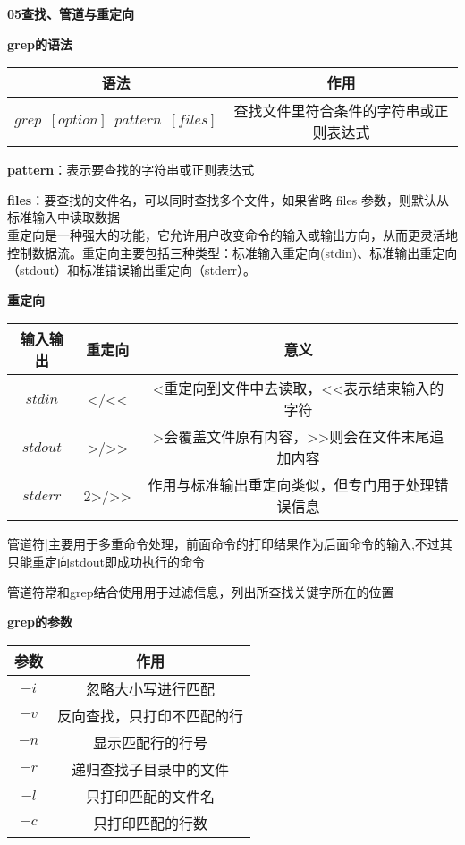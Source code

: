 \textbf{05查找、管道与重定向}

\begin{center}
\textbf{grep\enspace 的语法}

	\begin{tabular}{cc}
		\toprule[1.5pt]
		语法 & 作用\\
		\midrule[1pt]
		$  grep\enspace [option]\enspace pattern\enspace [files]$		&查找文件里符合条件的字符串或正则表达式\\
		\bottomrule[1.5pt]
	\end{tabular}
\end{center}

\textbf{pattern}：表示要查找的字符串或正则表达式

\textbf{files}：要查找的文件名，可以同时查找多个文件，如果省略 files 参数，则默认从标准输入中读取数据\\

重定向是一种强大的功能，它允许用户改变命令的输入或输出方向，从而更灵活地控制数据流。重定向主要包括三种类型：标准输入重定向(stdin)、标准输出重定向（stdout）和标准错误输出重定向（stderr）。

\begin{center}
\textbf{重定向}

	\begin{tabular}{ccc}
		\toprule[1.5pt]
		输入输出 & 重定向 & 意义\\
		\midrule[1pt]
		$  stdin$		& <\enspace /\enspace <<		& <重定向到文件中去读取，<<表示结束输入的字符\\
		$  stdout$		& >\enspace /\enspace >>		& >会覆盖文件原有内容，>>则会在文件末尾追加内容\\
		$  stderr$		& 2>\enspace /\enspace 2>>		&作用与标准输出重定向类似，但专门用于处理错误信息\\
		\bottomrule[1.5pt]
	\end{tabular}
\end{center}

管道符|主要用于多重命令处理，前面命令的打印结果作为后面命令的输入,不过其只能重定向stdout即成功执行的命令

管道符常和grep结合使用用于过滤信息，列出所查找关键字所在的位置

\begin{center}
\textbf{grep的参数}

	\begin{tabular}{cc}
		\toprule[1.5pt]
		参数 & 作用\\
		\midrule[1pt]
		$  -i$		&忽略大小写进行匹配\\
		$  -v$		&反向查找，只打印不匹配的行\\
		$  -n$		&显示匹配行的行号\\
		$  -r$		&递归查找子目录中的文件\\
		$  -l$		&只打印匹配的文件名\\
		$  -c$		&只打印匹配的行数\\
		\bottomrule[1.5pt]
	\end{tabular}
\end{center}

